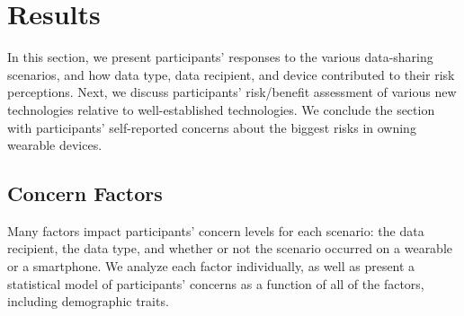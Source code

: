 \section{Results}
In this section, we present participants' responses to the various data-sharing scenarios, and how data type, data recipient, and device contributed to their risk perceptions. Next, we discuss participants' risk/benefit assessment of various new technologies relative to well-established technologies. We conclude the section with participants' self-reported concerns about the biggest risks in owning wearable devices.

\subsection{Concern Factors}
Many factors impact participants' concern levels for each scenario: the data recipient, the data type, and whether or not the scenario occurred on a wearable or a smartphone. We analyze each factor individually, as well as present a statistical model of participants' concerns as a function of all of the factors, including demographic traits.
